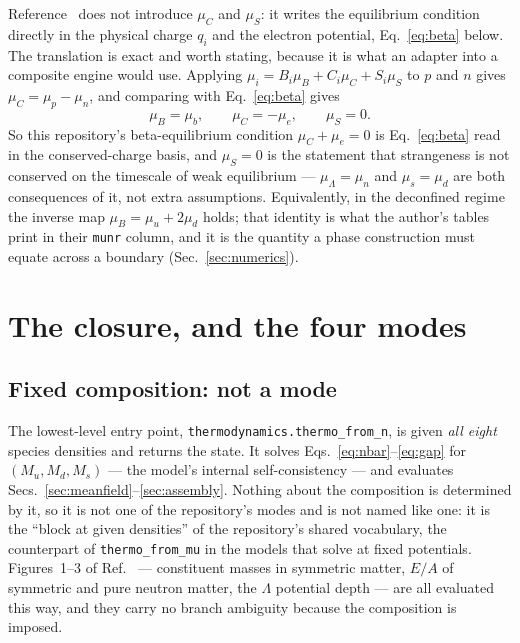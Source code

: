 \documentclass[aps,prc,onecolumn,superscriptaddress,nofootinbib,10pt]{revtex4-2}
\newcommand{\muB}{\mu_B}
\newcommand{\muC}{\mu_C}
\newcommand{\muS}{\mu_S}
\begin{document}
Reference~\cite{Xia2024} does not introduce $\muC$ and $\muS$: it writes the
equilibrium condition directly in the physical charge $q_i$ and the electron
potential, Eq.~\eqref{eq:beta} below. The translation is exact and worth
stating, because it is what an adapter into a composite engine would use.
Applying $\mu_i = B_i\muB + C_i\muC + S_i\muS$ to $p$ and $n$ gives
$\muC = \mu_p - \mu_n$, and comparing with Eq.~\eqref{eq:beta} gives
%
\begin{equation}
\muB = \mu_b , \qquad \muC = -\mu_e , \qquad \muS = 0 .
\label{eq:basis}
\end{equation}
%
So this repository's beta-equilibrium condition $\muC + \mu_e = 0$ is
Eq.~\eqref{eq:beta} read in the conserved-charge basis, and $\muS = 0$ is the
statement that strangeness is not conserved on the timescale of weak
equilibrium --- $\mu_\Lambda = \mu_n$ and $\mu_s = \mu_d$ are both consequences
of it, not extra assumptions. Equivalently, in the deconfined regime the
inverse map $\muB = \mu_u + 2\mu_d$ holds; that identity is what the author's
tables print in their \texttt{munr} column, and it is the quantity a phase
construction must equate across a boundary (Sec.~\ref{sec:numerics}).

\section{The closure, and the four modes}
\label{sec:modes}

\subsection{Fixed composition: not a mode}
\label{sec:fixedcomp}

The lowest-level entry point, \texttt{thermodynamics.thermo\_from\_n}, is
given \emph{all eight} species densities and returns the state. It solves
Eqs.~\eqref{eq:nbar}--\eqref{eq:gap} for $(M_u, M_d, M_s)$ --- the model's
internal self-consistency --- and evaluates
Secs.~\ref{sec:meanfield}--\ref{sec:assembly}. Nothing about the composition
is determined by it, so it is not one of the repository's modes and is not
named like one: it is the ``block at given densities'' of the repository's
shared vocabulary, the counterpart of \texttt{thermo\_from\_mu} in the models
that solve at fixed potentials. Figures~1--3 of Ref.~\cite{Xia2024} ---
constituent masses in symmetric matter, $E/A$ of symmetric and pure neutron
matter, the $\Lambda$ potential depth --- are all evaluated this way, and they
carry no branch ambiguity because the composition is imposed.
\end{document}
